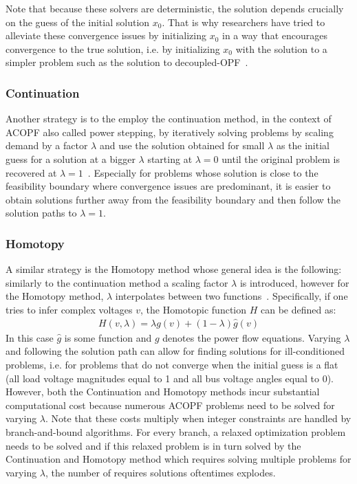 \documentclass[11pt]{cmuthesis} %
\begin{document}
Note that because these solvers are deterministic, the solution depends crucially on the guess of the initial solution $x_0$. That is why researchers have tried to alleviate these convergence issues by initializing $x_0$ in a way that encourages convergence to the true solution, i.e. by initializing $x_0$ with the solution to a simpler problem such as the solution to decoupled-OPF~\cite{leonidopoulos1995approximate,klump2000techniques,stott1971effective}.\\

\subsubsection{Continuation}
Another strategy is to the employ the continuation method, in the context of ACOPF also called power stepping, by iteratively solving problems by scaling demand by a factor $\lambda$ and use the solution obtained for small $\lambda$ as the initial guess for a solution at a bigger $\lambda$ starting at $\lambda = 0$ until the original problem is recovered at $\lambda = 1$~\cite{milano2009continuous}. Especially for problems whose solution is close to the feasibility boundary where convergence issues are predominant, it is easier to obtain solutions further away from the feasibility boundary and then follow the solution paths to $\lambda = 1$. 

\subsubsection{Homotopy}
A similar strategy is the Homotopy method whose general idea is the following: similarly to the continuation method a scaling factor $\lambda$ is introduced, however for the Homotopy method, $\lambda$ interpolates between two functions~\cite{okumura1991solution}. Specifically, if one tries to infer complex voltages $v$, the Homotopic function $H$ can be defined as:
\begin{align*}
H(v,\lambda) = \lambda g(v) + (1-\lambda) \hat{g}(v)
\end{align*}
In this case $\hat{g}$ is some function and $g$ denotes the power flow equations. Varying $\lambda$ and following the solution path can allow for finding solutions for ill-conditioned problems, i.e. for problems that do not converge when the initial guess is a flat (all load voltage
magnitudes equal to 1 and all bus voltage angles equal to
0).\\

However, both the Continuation and Homotopy methods incur substantial computational cost because numerous ACOPF problems need to be solved for varying $\lambda$. Note that these costs multiply when integer constraints are handled by branch-and-bound algorithms. For every branch, a relaxed optimization problem needs to be solved and if this relaxed problem is in turn solved by the Continuation and Homotopy method which requires solving multiple problems for varying $\lambda$, the number of requires solutions oftentimes explodes.
\end{document}
